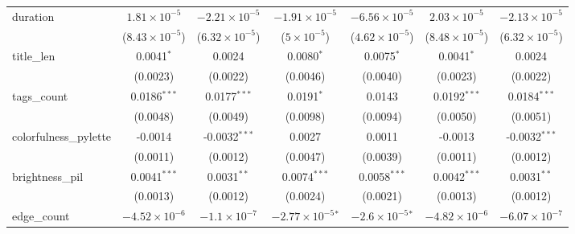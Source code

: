 \begin{table}[htbp]
\begin{tabular}{lcccccc}
      duration                       & $1.81\times 10^{-5}$    & $-2.21\times 10^{-5}$   & $-1.91\times 10^{-5}$        & $-6.56\times 10^{-5}$       & $2.03\times 10^{-5}$    & $-2.13\times 10^{-5}$\\    
                                     & ($8.43\times 10^{-5}$)  & ($6.32\times 10^{-5}$)  & ($5\times 10^{-5}$)          & ($4.62\times 10^{-5}$)      & ($8.48\times 10^{-5}$)  & ($6.32\times 10^{-5}$)\\    
      title\_len                     & 0.0041$^{*}$            & 0.0024                  & 0.0080$^{*}$                 & 0.0075$^{*}$                & 0.0041$^{*}$            & 0.0024\\   
                                     & (0.0023)                & (0.0022)                & (0.0046)                     & (0.0040)                    & (0.0023)                & (0.0022)\\   
      tags\_count                    & 0.0186$^{***}$          & 0.0177$^{***}$          & 0.0191$^{*}$                 & 0.0143                      & 0.0192$^{***}$          & 0.0184$^{***}$\\   
                                     & (0.0048)                & (0.0049)                & (0.0098)                     & (0.0094)                    & (0.0050)                & (0.0051)\\   
      colorfulness\_pylette          & -0.0014                 & -0.0032$^{***}$         & 0.0027                       & 0.0011                      & -0.0013                 & -0.0032$^{***}$\\   
                                     & (0.0011)                & (0.0012)                & (0.0047)                     & (0.0039)                    & (0.0011)                & (0.0012)\\   
      brightness\_pil                & 0.0041$^{***}$          & 0.0031$^{**}$           & 0.0074$^{***}$               & 0.0058$^{***}$              & 0.0042$^{***}$          & 0.0031$^{**}$\\   
                                     & (0.0013)                & (0.0012)                & (0.0024)                     & (0.0021)                    & (0.0013)                & (0.0012)\\   
      edge\_count                    & $-4.52\times 10^{-6}$   & $-1.1\times 10^{-7}$    & $-2.77\times 10^{-5}$$^{*}$  & $-2.6\times 10^{-5}$$^{*}$  & $-4.82\times 10^{-6}$   & $-6.07\times 10^{-7}$\\    

\end{tabular}
\end{table}
